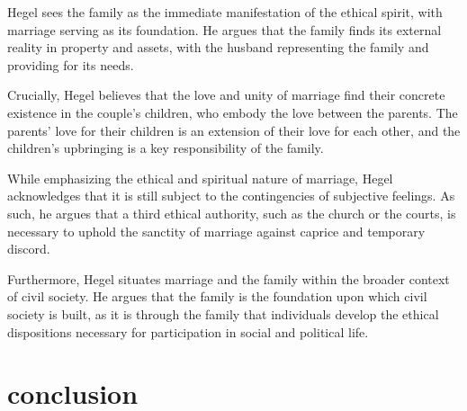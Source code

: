 \documentclass{article}
\begin{document}
Hegel sees the family as the immediate manifestation of the ethical spirit, with marriage serving as its foundation. He argues that the family finds its external reality in property and assets, with the husband representing the family and providing for its needs.

Crucially, Hegel believes that the love and unity of marriage find their concrete existence in the couple's children, who embody the love between the parents. The parents' love for their children is an extension of their love for each other, and the children's upbringing is a key responsibility of the family.

While emphasizing the ethical and spiritual nature of marriage, Hegel acknowledges that it is still subject to the contingencies of subjective feelings. As such, he argues that a third ethical authority, such as the church or the courts, is necessary to uphold the sanctity of marriage against caprice and temporary discord.

Furthermore, Hegel situates marriage and the family within the broader context of civil society. He argues that the family is the foundation upon which civil society is built, as it is through the family that individuals develop the ethical dispositions necessary for participation in social and political life.





\section{conclusion}


\printbibliography{}
\end{document}
